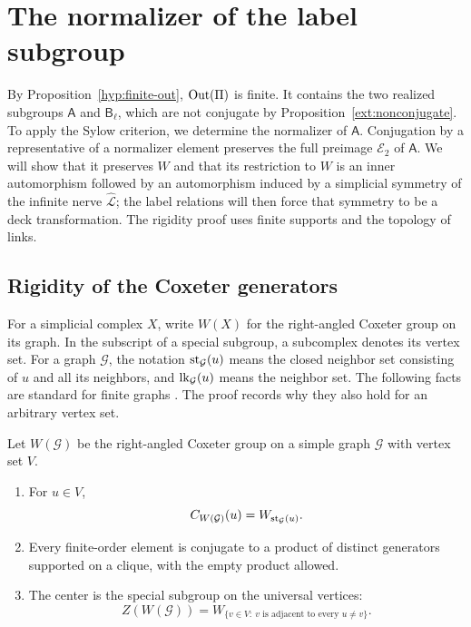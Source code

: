 \section{The normalizer of the label subgroup}
\label{nor:section}

By Proposition~\ref{hyp:finite-out}, $\operatorname{Out}(\Pi)$ is finite.
It contains the two realized subgroups $\mathsf A$ and
$\mathsf B_\ell$, which are not conjugate by
Proposition~\ref{ext:nonconjugate}.  To apply the Sylow criterion,
we determine the normalizer of $\mathsf A$.  Conjugation by a
representative of a normalizer element preserves the full preimage
$\mathcal E_2$ of $\mathsf A$.  We will show that it preserves $W$
and that its restriction to $W$ is an inner automorphism followed by
an automorphism induced by a simplicial symmetry of the infinite nerve
$\widehat{\mathcal L}$; the label relations will then force that
symmetry to be a deck transformation.  The rigidity proof uses finite
supports and the topology of links.

\subsection{Rigidity of the Coxeter generators}

For a simplicial complex $X$, write $W(X)$ for the right-angled
Coxeter group on its graph.  In the subscript of a special
subgroup, a subcomplex denotes its vertex set.  For a graph
$\mathcal G$, the notation $\operatorname{st}_{\mathcal G}(u)$ means the
closed neighbor set consisting of $u$ and all its neighbors,
and $\operatorname{lk}_{\mathcal G}(u)$ means the neighbor set.  The following
facts are standard for finite graphs
\cite[Lemmas~2.4--2.7]{GutierrezPiggottRuane2012}.  The proof
records why they also hold for an arbitrary vertex set.

\begin{lemma}\label{nor:coxeter-facts}
Let $W(\mathcal G)$ be the right-angled Coxeter group on a simple
graph $\mathcal G$ with vertex set $V$.
\begin{enumerate}
\item For $u\in V$,
\[
 C_{W(\mathcal G)}(u)=W_{\operatorname{st}_{\mathcal G}(u)}.
\]
\item Every finite-order element is conjugate to a product of
distinct generators supported on a clique, with the empty
product allowed.
\item The center is the special subgroup on the universal
vertices:
\[
 Z(W(\mathcal G))
 =W_{\{v\in V:\ v\text{ is adjacent to every }u\ne v\}}.
\]
\end{enumerate}
\end{lemma}

